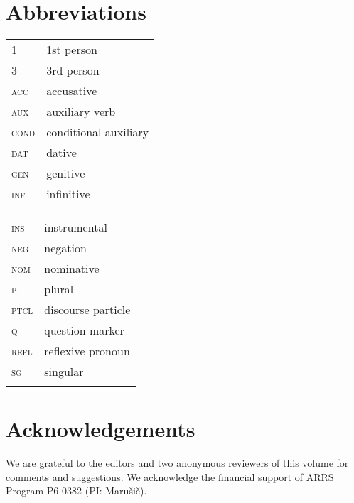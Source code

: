 \documentclass[output=paper,modfonts,newtxmath,hidelinks]{langscibook}
\begin{document}
\section*{Abbreviations}
\begin{tabularx}{.5\textwidth}{@{}lQ@{}}
\textsc{1}&1st person\\
\textsc{3}&3rd person\\
\textsc{acc}&accusative\\
\textsc{aux}&auxiliary verb\\
\textsc{cond}&conditional auxiliary\\
\textsc{dat}&dative\\
\textsc{gen}&genitive\\
\textsc{inf}&infinitive\\
\end{tabularx}%
\begin{tabularx}{.5\textwidth}{@{}lQ@{}}
\textsc{ins}&instrumental\\
\textsc{neg}&negation\\
\textsc{nom}&nominative\\
\textsc{pl}&plural\\
\textsc{ptcl}&discourse particle\\
\textsc{q}&question marker\\
\textsc{refl}&reflexive pronoun\\
\textsc{sg}&singular\\
&\\
\end{tabularx}


\section*{Acknowledgements}
We are grateful to the editors and two anonymous reviewers of this volume for comments and suggestions. We acknowledge the financial support of ARRS Program P6-0382 (PI: Marušič).

\sloppy
\printbibliography[heading=subbibliography,notkeyword=this]
\end{document}
